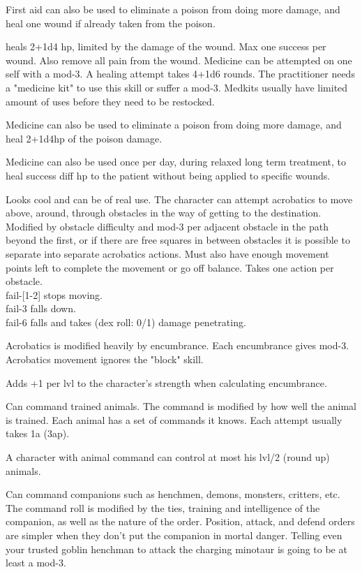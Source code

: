 First aid can also be used to eliminate a poison from doing more damage, and heal one wound if already taken from the poison.


 heals 2+1d4 hp, limited by the damage of the wound. Max one success per wound. Also remove all pain from the wound. Medicine can be attempted on one self with a mod-3. A healing attempt takes 4+1d6 rounds. The practitioner needs a "medicine kit" to use this skill or suffer a mod-3. Medkits usually have limited amount of uses before they need to be restocked.

Medicine can also be used to eliminate a poison from doing more damage, and heal 2+1d4hp of the poison damage.

Medicine can also be used once per day, during relaxed long term treatment, to heal success diff hp to the patient without being applied to specific wounds.


 Looks cool and can be of real use. The character can attempt acrobatics to move above, around, through obstacles in the way of getting to the destination. Modified by obstacle difficulty and mod-3 per adjacent obstacle in the path beyond the first, or if there are free squares in between obstacles it is possible to separate into separate acrobatics actions. Must also have enough movement points left to complete the movement or go off balance. Takes one action per obstacle. \\
fail-[1-2] stops moving. \\
fail-3 falls down. \\
fail-6 falls and takes (dex roll: 0/1) damage penetrating.

Acrobatics is modified heavily by encumbrance. Each encumbrance gives mod-3.
Acrobatics movement ignores the "block" skill.


 Adds +1 per lvl to the character's strength when calculating encumbrance.


 Can command trained animals. The command is modified by how well the animal is trained. Each animal has a set of commands it knows. Each attempt usually takes 1a (3ap).

A character with animal command can control at most his lvl/2 (round up) animals.


 Can command companions such as henchmen, demons, monsters, critters, etc. The command roll is modified by the ties, training and intelligence of the companion, as well as the nature of the order. Position, attack, and defend orders are simpler when they don't put the companion in mortal danger. Telling even your trusted goblin henchman to attack the charging minotaur is going to be at least a mod-3.

